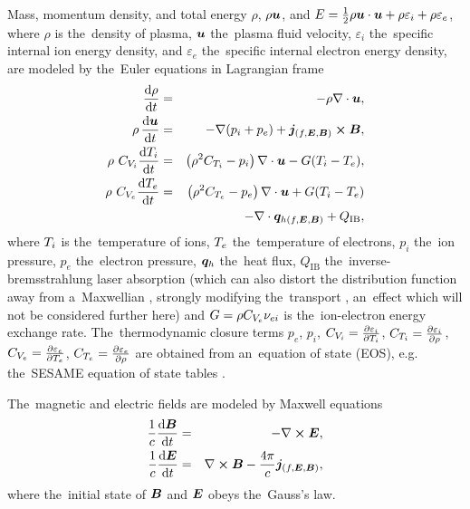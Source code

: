 Mass, momentum density, and total energy 
$\rho$, $\rho\boldsymbol{u}$, and 
$E = \frac{1}{2}\rho\boldsymbol{u}\cdot\boldsymbol{u} + 
 \rho \varepsilon_i + \rho \varepsilon_e$, 
where $\rho$ is 
the~density of plasma, $\boldsymbol{u}$ the~plasma fluid velocity, $\varepsilon_i$ 
the~specific internal ion energy density, 
and $\varepsilon_e$ the~specific internal 
electron energy density,
are modeled by the~Euler equations in Lagrangian frame 
\cite{Holec_DGBGKT_2016, Holec_PoPNTH2018}
\begin{eqnarray}
 \frac{\text{d} \rho}{\text{d} t} &=& - \rho\nabla\cdot\boldsymbol{u}
 , 
 \label{eq:NTH_rho}\\
 \rho\, \frac{\text{d} \boldsymbol{u}}{\text{d} t} &=& - \nabla (p_i + p_e) 
 + \boldsymbol{j}_{(f, \boldsymbol{E}, \boldsymbol{B})} \boldsymbol{\times}\boldsymbol{B}
 ,  
 \label{eq:NTH_v}\\
 \rho~C_{V_i}\frac{\text{d} T_i}{\text{d} t} 
 &=& 
 \left(\rho^2 C_{T_i} - p_i\right)\nabla\cdot\boldsymbol{u} 
 - G(T_i - T_e)
 ,  
 \label{eq:NTH_Ti}\\
 \rho~C_{V_e} \frac{\text{d} T_e}{\text{d} t}
  &=& 
 \left(\rho^2 C_{T_e} - p_e \right) \nabla\cdot\boldsymbol{u}  
 + G(T_i - T_e)
 \nonumber\\ 
 && - \nabla\cdot\boldsymbol{q}_{h(f, \boldsymbol{E}, \boldsymbol{B})} + Q_{\text{IB}} 
 , 
 \label{eq:NTH_Te}
\end{eqnarray}
where $T_i$ is the~temperature of ions, $T_e$ the~temperature of electrons,
$p_i$ the~ion pressure, $p_e$ the~electron pressure,
$\boldsymbol{q}_h$ the~heat flux, $Q_{\text{IB}}$ the~inverse-bremsstrahlung laser 
absorption (which can also distort the distribution function away from 
a~Maxwellian \cite{Langdon80}, strongly modifying the~transport 
\cite{Ridgers08_2}, an~effect which will not be considered further here) and 
$G = \rho C_{V_e} \nu_{ei}$ is 
the~ion-electron energy exchange rate. 
The~thermodynamic closure terms 
$p_e$, $p_i$, 
$C_{V_i} = \frac{\partial \varepsilon_i}{\partial T_i}$, 
$C_{T_i} = \frac{\partial{\varepsilon_i}}{\partial{\rho}}$,
$C_{V_e} = \frac{\partial \varepsilon_e}{\partial T_e}$, 
$C_{T_e} = \frac{\partial{\varepsilon_e}}{\partial{\rho}}$
are obtained from an~equation of state (EOS), e.g.
the~SESAME equation of state tables
\cite{T4_SESAME_83, Lyon_SESAME_EOS_database-TechRep-92}.

The~magnetic and electric fields are modeled by Maxwell equations
\begin{eqnarray}
  \frac{1}{c}\frac{\text{d} \boldsymbol{B}}{\text{d} t} &=& - \nabla\boldsymbol{\times}\boldsymbol{E}
  ,
  \label{eq:Faraday} \\
  \frac{1}{c}\frac{\text{d} \boldsymbol{E}}{\text{d} t} &=& \nabla\boldsymbol{\times}\boldsymbol{B} - \frac{4\pi}{c}
  \boldsymbol{j}_{(f, \boldsymbol{E}, \boldsymbol{B})}
  ,
  \label{eq:Ampere}
\end{eqnarray}
where the~initial state of $\boldsymbol{B}$ and $\boldsymbol{E}$ obeys the~Gauss's law.


